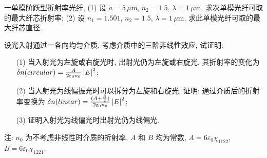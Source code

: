 \documentclass{assignment}
\begin{document}
\begin{prob}
    一单模阶跃型折射率光纤, (1) 设 $a=5\,\mu$m, $n_2=1.5$, $\lambda=1\,\mu$m, 求次单模光纤可取的最大纤芯折射率; (2) 设 $n_1=1.501$, $n_2=1.5$, $\lambda=1\,\mu$m, 求此单模光纤可取的最大纤芯直径.
\end{prob}
\begin{sol}
    
\end{sol}

\begin{prob}
    设光入射通过一各向均匀介质, 考虑介质中的三阶非线性效应, 试证明:
    \begin{itemize}
        \item[(1)] 当入射光为左旋或右旋光时, 出射光仍为左旋或右旋光, 其折射率的变化为 $\delta n(circular)=\frac{A}{2\varepsilon_0n_0}\left\lvert E\right\rvert^2$;
        \item[(2)] 当入射光为线偏振光时可以拆分为左旋和右旋光, 证明: 通过介质后的折射率变换为 $\delta n(linear)=\frac{(A+\frac{B}{2})}{2\varepsilon_0n_0}\left\lvert E\right\rvert^2$;
        \item[(3)] 证明入射光为线偏光时出射光仍为线偏光.
    \end{itemize}
    注: $n_0$ 为不考虑非线性时介质的折射率, $A$ 和 $B$ 均为常数, $A=6\varepsilon_0\chi_{1122}$, $B=6\varepsilon_0\chi_{1221}$.
\end{prob}
\begin{pf}
    
\end{pf}
\end{document}
